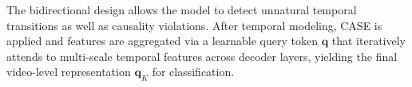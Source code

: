 The bidirectional design allows the model to detect unnatural temporal transitions as well as causality violations. After temporal modeling, CASE is applied and features are aggregated via a learnable query token $\mathbf{q}$ that iteratively attends to multi-scale temporal features across decoder layers, yielding the final video-level representation $\mathbf{q}_K$ for classification.
